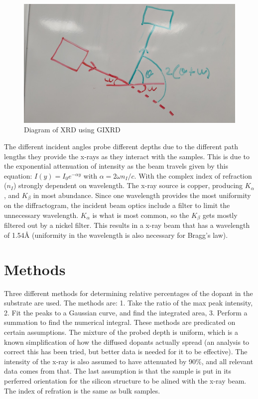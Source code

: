 \documentclass{article}
\begin{document}
\begin{multicols}{2}
\begin{figure}[H]
    \centering
    \includegraphics[width=\linewidth]{2theta scan diagram.jpg}
    \caption{Diagram of XRD using GIXRD}
    \label{fig:GIXRD diagram}
\end{figure}

    The different incident angles probe different depths due to the different 
    path lengths they provide the x-rays as they interact with the samples. This 
    is due to the exponential attenuation of intensity as the beam travels given 
    by this equation: $I(y)=I_0e^{-\alpha y}$ with $\alpha=2\omega n_I/c$\citep{https://doi.org/10.1002/jps.22202,hecht}. With 
    the complex index of refraction ($n_I$) strongly dependent on wavelength. 
    The x-ray source is copper, producing $K_\alpha$, and $K_\beta$ in most 
    abundance. Since one wavelength provides the most uniformity on the diffractogram, 
    the incident beam optics include a filter to limit the unnecessary wavelength. 
    $K_\alpha$ is what is most common, so the $K_\beta$ gets mostly filtered out by a
     nickel filter. This results in a x-ray beam that has a wavelength of 1.54\AA
      \space (uniformity in the wavelength is also necessary for Bragg's law).
    
\section{Methods}

    Three different methods for determining relative percentages of the dopant
     in the substrate are used. The methods are: 1. Take the ratio of the max 
     peak intensity, 2. Fit the peaks to a Gaussian curve, and find the integrated 
     area, 3. Perform a summation to find the numerical integral. These methods 
     are predicated on certain assumptions. The mixture of the probed depth is 
     uniform, which is a known simplification of how the diffused dopants actually 
     spread (an analysis to correct this has been tried, but better data is needed 
     for it to be effective). The intensity of the x-ray is also assumed to have 
     attenuated by 90\%, and all relevant data comes from that. The last assumption 
     is that the sample is put in its perferred orientation for the silicon structure 
     to be alined with the x-ray beam. The index of refration is the same as bulk samples\citep{COLOMBI2007554}.
    

\end{multicols}
\end{document}
